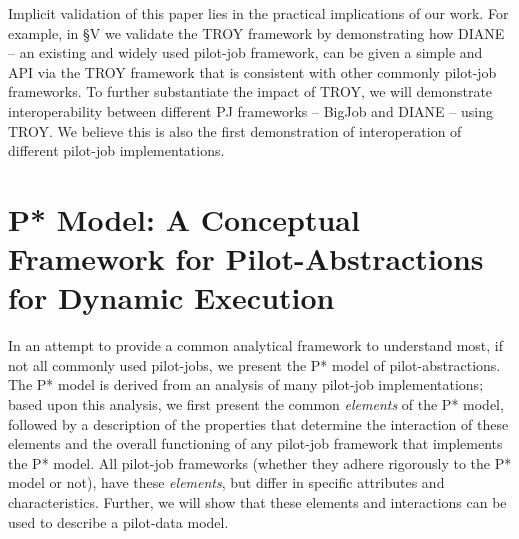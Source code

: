 \documentclass[conference,final]{IEEEtran}
\newcommand{\jhanote}[1]{ {\textcolor{red} { ***shantenu: #1 }}}
\newcommand{\jhanote}[1]{}
\newcommand{\upp}{\vspace*{-0.5em}}
\begin{document}
Implicit validation of this paper lies in the practical implications
of our work. For example, in \S{V} we validate the TROY framework by
demonstrating how DIANE~\cite{Moscicki:908910} -- an existing and
widely used pilot-job framework, can be given a simple and API via the
TROY framework that is consistent with other commonly pilot-job
frameworks. To further substantiate the impact of TROY, we will
demonstrate interoperability between different PJ frameworks -- BigJob
and DIANE -- using TROY. We believe this is also the first
demonstration of interoperation of different pilot-job
implementations.





\section{P* Model: A Conceptual Framework for Pilot-Abstractions for
  Dynamic Execution \upp\upp}
\label{sec:pilot-model}

In an attempt to provide a common analytical framework to understand
most, if not all commonly used pilot-jobs, we present the P* model of
pilot-abstractions. The P* model is derived from an analysis of many
pilot-job implementations; based upon this analysis, we first present
the common {\it elements} of the P* model, followed by a description
of the properties that determine the interaction of these elements and
the overall functioning of any pilot-job framework that implements the
P* model. All pilot-job frameworks (whether they adhere rigorously to
the P* model or not), have these {\it elements}, but differ in
specific attributes and characteristics.  Further, we will show that
these elements and interactions can be used to describe a pilot-data
model.
 
\end{document}
